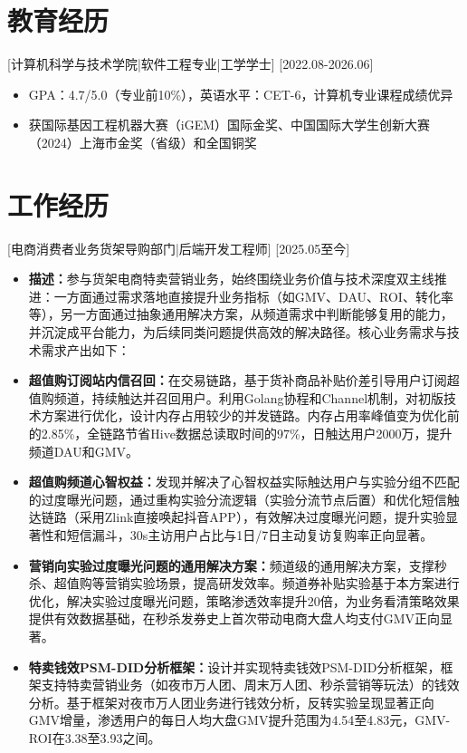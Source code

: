 \documentclass{style/template}
\begin{document}

\ResumeTitle

\section{教育经历}

[\textnormal{计算机科学与技术学院|软件工程专业|}工学学士]
[2022.08-2026.06]
\begin{itemize}
    \item GPA：4.7/5.0（专业前10\%），英语水平：CET-6，计算机专业课程成绩优异
    \item 获国际基因工程机器大赛（iGEM）国际金奖、中国国际大学生创新大赛（2024）上海市金奖（省级）和全国铜奖
\end{itemize}

\section{工作经历}

[\textnormal{电商消费者业务货架导购部门|}后端开发工程师]
[2025.05至今]
\begin{itemize}
    \item \textbf{描述：}参与货架电商特卖营销业务，始终围绕业务价值与技术深度双主线推进：一方面通过需求落地直接提升业务指标（如GMV、DAU、ROI、转化率等），另一方面通过抽象通用解决方案，从频道需求中判断能够复用的能力，并沉淀成平台能力，为后续同类问题提供高效的解决路径。核心业务需求与技术需求产出如下：
    \item \textbf{超值购订阅站内信召回：}在交易链路，基于货补商品补贴价差引导用户订阅超值购频道，持续触达并召回用户。利用Golang协程和Channel机制，对初版技术方案进行优化，设计内存占用较少的并发链路。内存占用率峰值变为优化前的2.85\%，全链路节省Hive数据总读取时间的97\%，日触达用户2000万，提升频道DAU和GMV。
    \item \textbf{超值购频道心智权益：}发现并解决了心智权益实际触达用户与实验分组不匹配的过度曝光问题，通过重构实验分流逻辑（实验分流节点后置）和优化短信触达链路（采用Zlink直接唤起抖音APP），有效解决过度曝光问题，提升实验显著性和短信漏斗，30s主访用户占比与1日/7日主动复访复购率正向显著。
    \item \textbf{营销向实验过度曝光问题的通用解决方案：}频道级的通用解决方案，支撑秒杀、超值购等营销实验场景，提高研发效率。频道券补贴实验基于本方案进行优化，解决实验过度曝光问题，策略渗透效率提升20倍，为业务看清策略效果提供有效数据基础，在秒杀发券史上首次带动电商大盘人均支付GMV正向显著。
    \item \textbf{特卖钱效PSM-DID分析框架：}设计并实现特卖钱效PSM-DID分析框架，框架支持特卖营销业务（如夜市万人团、周末万人团、秒杀营销等玩法）的钱效分析。基于框架对夜市万人团业务进行钱效分析，反转实验呈现显著正向GMV增量，渗透用户的每日人均大盘GMV提升范围为4.54至4.83元，GMV-ROI在3.38至3.93之间。
\end{itemize}
\end{document}
